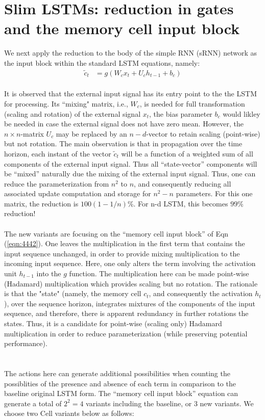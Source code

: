 \documentclass{article}
\begin{document}
{{{\section{Slim LSTMs: reduction in gates and the memory cell input block}

We next apply the reduction to the body of the simple RNN (sRNN) network as the input block within the standard LSTM equations, namely:
\begin{align}
	\label{eqn:4442}	\tilde{c}_t &= g(W_c x_t + U_c h_{t-1} + b_c)
\end{align}
\\
It is observed that the external input signal has its entry point to the the LSTM for processing. Its ``mixing" matrix, i.e., $W_c $, is needed for full transformation (scaling and rotation) of the external signal $x_t$, the bias parameter $b_c$ would likley be needed in case the external signal does not have zero mean. However, the $n \times n$-matrix $U_c$ may be replaced by an $n-d$-vector to retain scaling (point-wise) but not rotation. The main observation is that in propagation over the time horizon, each instant of the  vector $\tilde{c}_t$ will be a function of a weighted sum of all components of the external input signal. Thus all ``state-vector'' components will be ``mixed'' naturally due the mixing of the external input signal. Thus, one can reduce the parameterization from
$n^2$ to $n$, and consequently reducing all associated update computation and storage for $n^2-n$ parameters.  For this one matrix, the reduction is $100(1-1/n)\%$. For n-d LSTM, this becomes $99 \%$ reduction!
\\
\\
The new variants are focusing on the ``memory cell input block'' of Eqn (\ref{eqn:4442}).  One leaves the multiplication in the first term that contains the input sequence unchanged, in order to provide mixing multiplication to the incoming input sequence.  Here, one only alters the term involving the activation unit $h_{t-1}$ into the $g$ function. The multiplication here can be  made point-wise (Hadamard) multiplication which provides scaling but no rotation. The rationale is that the "state" (namely, the memory cell  $c_t$, and consequently the activation $h_t$), over the sequence horizon, integrates mixtures of the components of the input sequence, and therefore, there is apparent redundancy in further rotations the states. Thus, it is a candidate for point-wise (scaling only) Hadamard multiplication in order to reduce parameterization (while preserving potential performance). \\
\\
\\
The actions here can generate additional possibilities when counting the possiblities of the presence and absence of each term in comparison to the baseline original LSTM form. The ``memory cell input block'' equation can generate a total of $2^2=4$ variants including the baseline, or 3 new variants. We choose two Cell variants below as follows:

}}}
\end{document}

